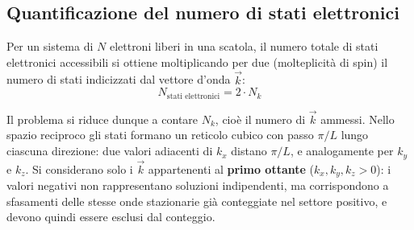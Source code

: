 \subsection{Quantificazione del numero di stati elettronici}

Per un sistema di \(N\) elettroni liberi in una scatola, il numero totale di stati elettronici accessibili si ottiene moltiplicando per due (molteplicità di spin) il numero di stati indicizzati dal vettore d'onda \(\vec{k}\):
\begin{equation}
    N_{\text{stati elettronici}} = 2 \cdot N_{k}
\end{equation}

Il problema si riduce dunque a contare \(N_{{k}}\), cioè il numero di \(\vec{k}\) ammessi. Nello spazio reciproco gli stati formano un reticolo cubico con passo \(\pi/L\) lungo ciascuna direzione: due valori adiacenti di \(k_x\) distano \(\pi/L\), e analogamente per \(k_y\) e \(k_z\). Si considerano solo i \(\vec{k}\) appartenenti al \textbf{primo ottante} (\(k_x, k_y, k_z > 0\)): i valori negativi non rappresentano soluzioni indipendenti, ma corrispondono a sfasamenti delle stesse onde stazionarie già conteggiate nel settore positivo, e devono quindi essere esclusi dal conteggio.

